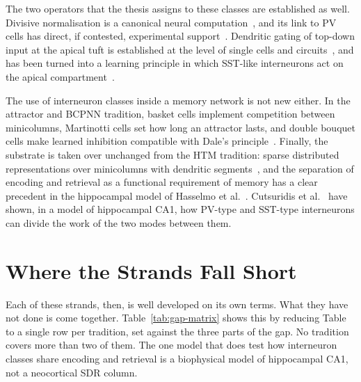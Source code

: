 The two operators that the thesis assigns to these classes are established as
well. Divisive normalisation is a canonical neural
computation~\cite{carandini2012normalization}, and its link to PV cells has
direct, if contested, experimental support~\cite{wilson2012division}.
Dendritic gating of top-down input at the apical tuft is established at the
level of single cells and circuits~\cite{larkum1999new,larkum2013,murayama2009dendritic},
and has been turned into a learning principle in which SST-like interneurons
act on the apical
compartment~\cite{urbanczik2014learning,sacramento2018dendritic}.

The use of interneuron classes inside a memory network is not new either. In
the attractor and BCPNN tradition, basket cells implement competition between
minicolumns, Martinotti cells set how long an attractor lasts, and double
bouquet cells make learned inhibition compatible with Dale's
principle~\cite{krishnamurthy2012cortical,chrysanthidis2019introducing}.
Finally, the substrate is taken over unchanged from the HTM tradition: sparse
distributed representations over minicolumns with dendritic
segments~\cite{ahmad2016sdr,hawkins2016neurons,cui2017sp}, and the separation of
encoding and retrieval as a functional requirement of memory has a clear
precedent in the hippocampal model of Hasselmo et al.~\cite{hasselmo2002theta}.
Cutsuridis et al.~\cite{cutsuridis2010encoding} have shown, in a model of
hippocampal CA1, how PV-type and SST-type interneurons can divide the work of
the two modes between them.

\section{Where the Strands Fall Short}
\label{sec:gap-open}

Each of these strands, then, is well developed on its own terms. What they
have not done is come together. Table~\ref{tab:gap-matrix} shows this by
reducing Table~ to a single row per tradition,
set against the three parts of the gap. No tradition covers more than two of
them. The one model that does test how interneuron classes share encoding and
retrieval is a biophysical model of hippocampal CA1, not a neocortical SDR
column.

